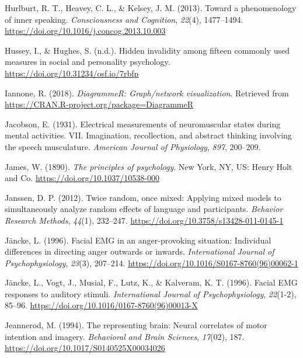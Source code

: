 \documentclass[a4paper,12pt,twoside,onecolumn,openright,final,oldfontcommands]{memoir}
\begin{document}
\leavevmode\hypertarget{ref-Hurlburt2013}{}%
Hurlburt, R. T., Heavey, C. L., \& Kelsey, J. M. (2013). Toward a phenomenology of inner speaking. \emph{Consciousness and Cognition}, \emph{22}(4), 1477--1494. \url{https://doi.org/10.1016/j.concog.2013.10.003}

\leavevmode\hypertarget{ref-hussey_hidden_2018}{}%
Hussey, I., \& Hughes, S. (n.d.). Hidden invalidity among fifteen commonly used measures in social and personality psychology. \url{https://doi.org/10.31234/osf.io/7rbfp}

\leavevmode\hypertarget{ref-R-DiagrammeR}{}%
Iannone, R. (2018). \emph{DiagrammeR: Graph/network visualization}. Retrieved from \url{https://CRAN.R-project.org/package=DiagrammeR}

\leavevmode\hypertarget{ref-jacobson_electrical_1931}{}%
Jacobson, E. (1931). Electrical measurements of neuromuscular states during mental activities. VII. Imagination, recollection, and abstract thinking involving the speech musculature. \emph{American Journal of Physiology}, \emph{897}, 200--209.

\leavevmode\hypertarget{ref-james_principles_1890}{}%
James, W. (1890). \emph{The principles of psychology}. New York, NY, US: Henry Holt and Co. \url{https://doi.org/10.1037/10538-000}

\leavevmode\hypertarget{ref-janssen_twice_2012}{}%
Janssen, D. P. (2012). Twice random, once mixed: Applying mixed models to simultaneously analyze random effects of language and participants. \emph{Behavior Research Methods}, \emph{44}(1), 232--247. \url{https://doi.org/10.3758/s13428-011-0145-1}

\leavevmode\hypertarget{ref-Jancke1996a}{}%
Jäncke, L. (1996). Facial EMG in an anger-provoking situation: Individual differences in directing anger outwards or inwards. \emph{International Journal of Psychophysiology}, \emph{23}(3), 207--214. \url{https://doi.org/10.1016/S0167-8760(96)00062-1}

\leavevmode\hypertarget{ref-Jancke1996}{}%
Jäncke, L., Vogt, J., Musial, F., Lutz, K., \& Kalveram, K. T. (1996). Facial EMG responses to auditory stimuli. \emph{International Journal of Psychophysiology}, \emph{22}(1-2), 85--96. \url{https://doi.org/10.1016/0167-8760(96)00013-X}

\leavevmode\hypertarget{ref-jeannerod_representing_1994}{}%
Jeannerod, M. (1994). The representing brain: Neural correlates of motor intention and imagery. \emph{Behavioral and Brain Sciences}, \emph{17}(02), 187. \url{https://doi.org/10.1017/S0140525X00034026}
\end{document}

